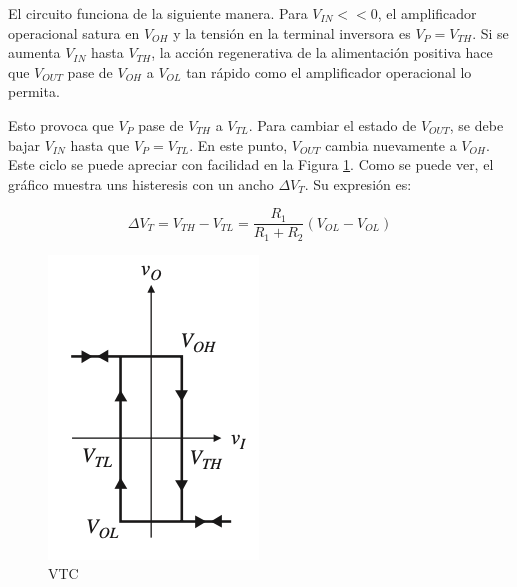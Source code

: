 El circuito funciona de la siguiente manera. Para $V_{IN}<<0$, el amplificador operacional satura en $V_{OH}$ y la tensión en la terminal inversora es $V_P = V_{TH}$. Si se aumenta $V_{IN}$ hasta $V_{TH}$, la acción regenerativa de la alimentación positiva hace que $V_{OUT}$ pase de $V_{OH}$ a $V_{OL}$ tan rápido como el amplificador operacional lo permita. 

Esto provoca que $V_P$ pase de $V_{TH}$ a $V_{TL}$. Para cambiar el estado de $V_{OUT}$, se debe bajar $V_{IN}$ hasta que $V_P = V_{TL}$. En este punto, $V_{OUT}$ cambia nuevamente a $V_{OH}$. Este ciclo se puede apreciar con facilidad en la Figura \ref{fig:ej3_VTC}. Como se puede ver, el gráfico muestra uns histeresis con un ancho $\Delta V_T$. Su expresión es:

\begin{equation}
    \Delta V_T = V_{TH} - V_{TL}= \frac{R_1}{R_1 + R_2} (V_{OL} - V_{OL})
    \label{eq:vt}
\end{equation}


\begin{figure}
    \begin{center}
        \includegraphics[width=0.65\linewidth]{../Ex3/Resources/vtc.png}  
        \caption{VTC}
        \label{fig:ej3_VTC} 
    \end{center}
\end{figure}
 
